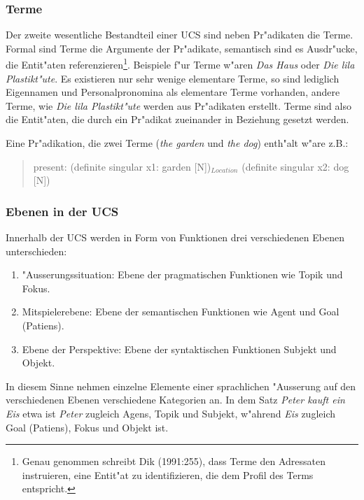 \documentclass[a4paper]{article}
\begin{document}
\subsubsection{Terme}

Der zweite wesentliche Bestandteil einer UCS sind neben Pr"adikaten die Terme.
Formal sind Terme die Argumente der Pr"adikate, semantisch sind es Ausdr"ucke,
die Entit"aten referenzieren\footnote{Genau genommen schreibt Dik (1991:255),
dass Terme den Adressaten instruieren, eine Entit"at zu identifizieren, die dem
Profil des Terms entspricht.}. Beispiele f"ur Terme w"aren \emph{Das Haus} oder
\emph{Die lila Plastikt"ute}. Es existieren nur sehr wenige elementare Terme,
so sind lediglich Eigennamen und Personalpronomina als elementare Terme
vorhanden, andere Terme, wie \emph{Die lila Plastikt"ute} werden aus
Pr"adikaten erstellt. Terme sind also die Entit"aten, die durch ein Pr"adikat
zueinander in Beziehung gesetzt werden.

Eine Pr"adikation, die zwei Terme (\emph{the garden} und \emph{the dog})
enth"alt w"are z.B.:

\begin{quote}
present: (definite singular x1: garden [N])$_{Location}$ (definite singular x2:
dog [N])
\end{quote}

\subsubsection{Ebenen in der UCS}

Innerhalb der UCS werden in Form von Funktionen drei verschiedenen Ebenen
unterschieden:

\begin{enumerate}
  \item {"Ausserungssituation: Ebene der pragmatischen Funktionen wie Topik und
  Fokus.}
  \item {Mitspielerebene: Ebene der semantischen Funktionen wie Agent und Goal
  (Patiens).}
  \item {Ebene der Perspektive: Ebene der syntaktischen Funktionen Subjekt und
  Objekt.}
\end{enumerate}

In diesem Sinne nehmen einzelne Elemente einer sprachlichen "Ausserung auf den
verschiedenen Ebenen verschiedene Kategorien an. In dem Satz \emph{Peter kauft
ein Eis} etwa ist \emph{Peter} zugleich Agens, Topik und Subjekt, w"ahrend
\emph{Eis} zugleich Goal (Patiens), Fokus und Objekt ist.
\end{document}
